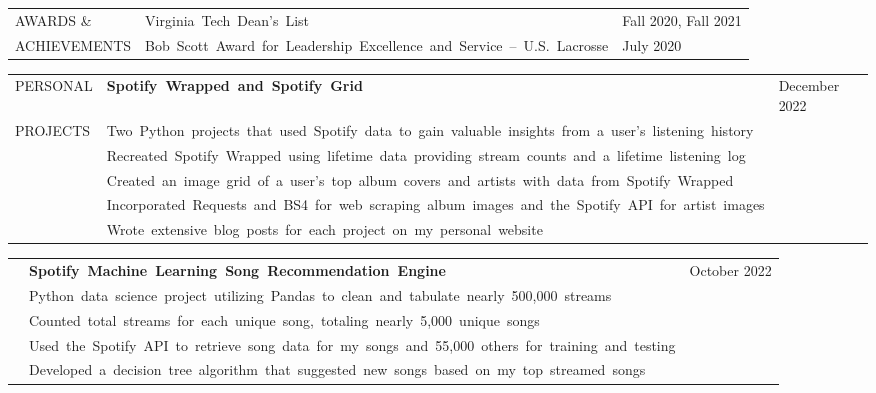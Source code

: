 \documentclass[12pt, letter]{book}
\begin{document}

\vspace{2mm}

\noindent
\begin{tabular}{@{}>{\raggedright\arraybackslash}p{3.5cm}@{}p{5cm}@{}>{\raggedleft\arraybackslash}p{10.5cm}@{}}
    \footnotesize {AWARDS \& } & {\footnotesize\mbox{Virginia Tech Dean’s List}} & \footnotesize {Fall 2020, Fall 2021} \\
    \footnotesize {ACHIEVEMENTS} & {\footnotesize\mbox{Bob Scott Award for Leadership Excellence and Service – U.S. Lacrosse}} & \footnotesize {July 2020} \\
\end{tabular}

\vspace{2mm}



\noindent
\begin{tabular}{@{}>{\raggedright\arraybackslash}p{3.5cm}@{}p{5cm}@{}>{\raggedleft\arraybackslash}p{10.5cm}@{}}
    \footnotesize {PERSONAL} & \textbf{\footnotesize\mbox{Spotify Wrapped and Spotify Grid}} & \footnotesize {December 2022} \\
    \footnotesize {PROJECTS} & {\footnotesize\mbox{Two Python projects that used Spotify data to gain valuable insights from a user's listening history}} \\
    & {\footnotesize\mbox{Recreated Spotify Wrapped using lifetime data providing stream counts and a lifetime listening log}} \\
    & {\footnotesize\mbox{Created an image grid of a user's top album covers and artists with data from Spotify Wrapped}} \\
    & {\footnotesize\mbox{Incorporated Requests and BS4 for web scraping album images and the Spotify API for artist images}} \\
    & {\footnotesize\mbox{Wrote extensive blog posts for each project on my personal website}} \\
\end{tabular}

\vspace{2mm}
    
\noindent
\begin{tabular}{@{}>{\raggedright\arraybackslash}p{3.5cm}@{}p{5cm}@{}>{\raggedleft\arraybackslash}p{10.5cm}@{}}
    & \textbf{\footnotesize\mbox{Spotify Machine Learning Song Recommendation Engine}} & \footnotesize {October 2022} \\
    & {\footnotesize\mbox{Python data science project utilizing Pandas to clean and tabulate nearly 500,000 streams}} \\
    & {\footnotesize\mbox{Counted total streams for each unique song, totaling nearly 5,000 unique songs}} \\
    & {\footnotesize\mbox{Used the Spotify API to retrieve song data for my songs and 55,000 others for training and testing}} \\
    & {\footnotesize\mbox{Developed a decision tree algorithm that suggested new songs based on my top streamed songs}}
\end{tabular}
\end{document}
